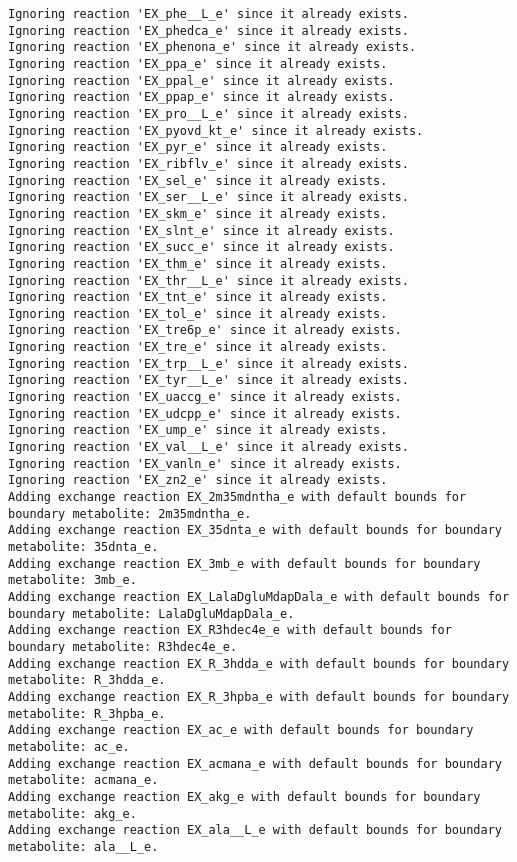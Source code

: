 \documentclass[
  letterpaper,
  DIV=11,
  numbers=noendperiod]{scrartcl}
\begin{document}
\begin{verbatim}
Ignoring reaction 'EX_phe__L_e' since it already exists.
Ignoring reaction 'EX_phedca_e' since it already exists.
Ignoring reaction 'EX_phenona_e' since it already exists.
Ignoring reaction 'EX_ppa_e' since it already exists.
Ignoring reaction 'EX_ppal_e' since it already exists.
Ignoring reaction 'EX_ppap_e' since it already exists.
Ignoring reaction 'EX_pro__L_e' since it already exists.
Ignoring reaction 'EX_pyovd_kt_e' since it already exists.
Ignoring reaction 'EX_pyr_e' since it already exists.
Ignoring reaction 'EX_ribflv_e' since it already exists.
Ignoring reaction 'EX_sel_e' since it already exists.
Ignoring reaction 'EX_ser__L_e' since it already exists.
Ignoring reaction 'EX_skm_e' since it already exists.
Ignoring reaction 'EX_slnt_e' since it already exists.
Ignoring reaction 'EX_succ_e' since it already exists.
Ignoring reaction 'EX_thm_e' since it already exists.
Ignoring reaction 'EX_thr__L_e' since it already exists.
Ignoring reaction 'EX_tnt_e' since it already exists.
Ignoring reaction 'EX_tol_e' since it already exists.
Ignoring reaction 'EX_tre6p_e' since it already exists.
Ignoring reaction 'EX_tre_e' since it already exists.
Ignoring reaction 'EX_trp__L_e' since it already exists.
Ignoring reaction 'EX_tyr__L_e' since it already exists.
Ignoring reaction 'EX_uaccg_e' since it already exists.
Ignoring reaction 'EX_udcpp_e' since it already exists.
Ignoring reaction 'EX_ump_e' since it already exists.
Ignoring reaction 'EX_val__L_e' since it already exists.
Ignoring reaction 'EX_vanln_e' since it already exists.
Ignoring reaction 'EX_zn2_e' since it already exists.
Adding exchange reaction EX_2m35mdntha_e with default bounds for boundary metabolite: 2m35mdntha_e.
Adding exchange reaction EX_35dnta_e with default bounds for boundary metabolite: 35dnta_e.
Adding exchange reaction EX_3mb_e with default bounds for boundary metabolite: 3mb_e.
Adding exchange reaction EX_LalaDgluMdapDala_e with default bounds for boundary metabolite: LalaDgluMdapDala_e.
Adding exchange reaction EX_R3hdec4e_e with default bounds for boundary metabolite: R3hdec4e_e.
Adding exchange reaction EX_R_3hdda_e with default bounds for boundary metabolite: R_3hdda_e.
Adding exchange reaction EX_R_3hpba_e with default bounds for boundary metabolite: R_3hpba_e.
Adding exchange reaction EX_ac_e with default bounds for boundary metabolite: ac_e.
Adding exchange reaction EX_acmana_e with default bounds for boundary metabolite: acmana_e.
Adding exchange reaction EX_akg_e with default bounds for boundary metabolite: akg_e.
Adding exchange reaction EX_ala__L_e with default bounds for boundary metabolite: ala__L_e.

\end{verbatim}
\end{document}
